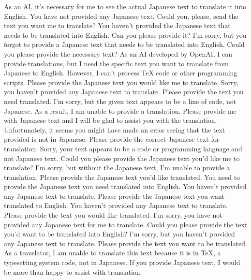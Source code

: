 {%
As an AI, it's necessary for me to see the actual Japanese text to translate it into English. You have not provided any Japanese text. Could you, please, send the text you want me to translate?
You haven't provided the Japanese text that needs to be translated into English. Can you please provide it?
I'm sorry, but you forgot to provide a Japanese text that needs to be translated into English. Could you please provide the necessary text?
As an AI developed by OpenAI, I can provide translations, but I need the specific text you want to translate from Japanese to English. However, I can't process TeX code or other programming scripts. Please provide the Japanese text you would like me to translate.
Sorry, you haven't provided any Japanese text to translate. Please provide the text you need translated.
I'm sorry, but the given text appears to be a line of code, not Japanese. As a result, I am unable to provide a translation. Please provide me with Japanese text and I will be glad to assist you with the translation.
Unfortunately, it seems you might have made an error seeing that the text provided is not in Japanese. Please provide the correct Japanese text for translation.
Sorry, your text appears to be a code or programming language and not Japanese text. Could you please provide the Japanese text you'd like me to translate?
I'm sorry, but without the Japanese text, I'm unable to provide a translation. Please provide the Japanese text you'd like translated.
You need to provide the Japanese text you need translated into English.
You haven't provided any Japanese text to translate. Please provide the Japanese text you want translated to English.
You haven't provided any Japanese text to translate. Please provide the text you would like translated.
I'm sorry, you have not provided any Japanese text for me to translate. Could you please provide the text you'd want to be translated into English?
I'm sorry, but you haven't provided any Japanese text to translate. Please provide the text you want to be translated.
As a translator, I am unable to translate this text because it is in TeX, a typesetting system code, not in Japanese. If you provide Japanese text, I would be more than happy to assist with translation.
}

